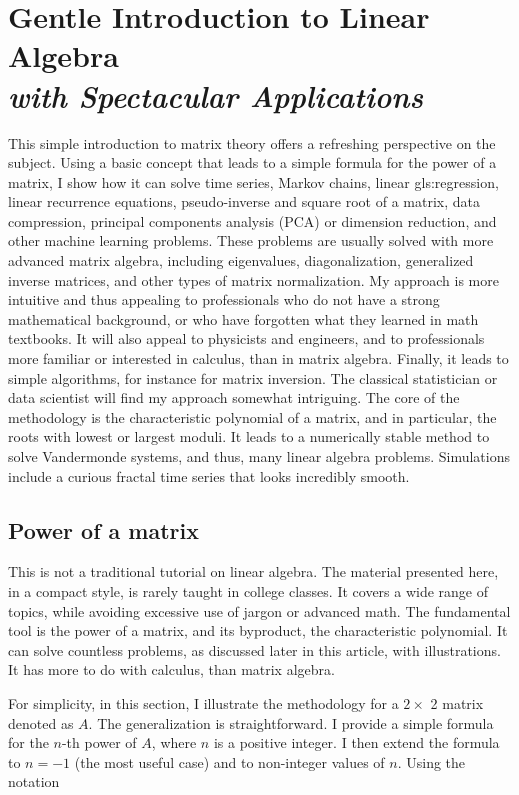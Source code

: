 \documentclass[oneside,10pt]{book}
\newcommand\Chapter[2]{
  \chapter[#1]{#1\\[2ex]\Large\itshape#2}
}
\begin{document}
\Chapter{Gentle Introduction to Linear Algebra}{with Spectacular Applications}\label{chapterlinear}

This simple introduction to matrix theory offers a refreshing perspective on the subject. Using a basic concept that leads to a simple formula for the power of a matrix, I show how it can solve time series, Markov chains, linear \gls{gls:regression}, linear recurrence equations, pseudo-inverse and square root of a matrix, data compression, principal components analysis (PCA) or dimension reduction, and other machine learning problems. These problems are usually solved with more advanced matrix algebra, including eigenvalues, diagonalization, generalized inverse matrices, and other types of matrix normalization. My approach is more intuitive and thus appealing to professionals who do not have a strong mathematical background, or who have forgotten what they learned in math textbooks. It will also appeal to physicists and engineers, and to professionals more familiar or interested in calculus, than in matrix algebra. Finally, it leads to simple algorithms, for instance for matrix inversion. The classical statistician or data scientist will find my approach somewhat intriguing. The core of the methodology is the characteristic polynomial of a matrix, and in particular, the roots with lowest or largest moduli. It leads to a numerically stable method to solve Vandermonde systems, and thus, many linear algebra problems. Simulations include a curious fractal time series that looks incredibly smooth.






\section{Power of a matrix}

This is not a traditional tutorial on linear algebra. The material presented here, in a compact style, is rarely taught in college classes. It covers a wide range of topics, while avoiding excessive use of jargon or advanced math. The fundamental tool is the power of a matrix, and its byproduct, the characteristic polynomial. It can solve countless problems, as discussed later in this article, with illustrations. It has more to do with calculus, than matrix algebra.

For simplicity, in this section, I illustrate the methodology for a $2 \times$ 2 matrix denoted as $A$. The generalization is straightforward. I provide a simple formula for the $n$-th power of $A$, where $n$ is a positive integer. I then extend the formula 
to $n = -1$ (the most useful case) and to non-integer values of $n$. 
Using the notation
\end{document}
